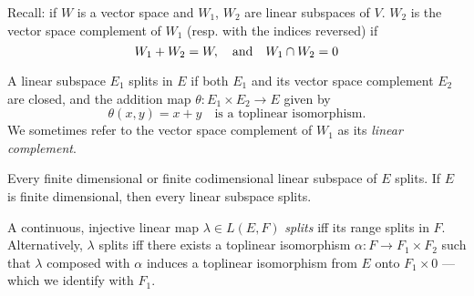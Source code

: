 \documentclass[../main-v2-manifolds.tex]{subfiles}
\begin{document}


Recall: if $W$ is a vector space and $W_1$, $W_2$ are linear subspaces of $V$. $W_2$ is the vector space complement of $W_1$ (resp. with the indices reversed) if 
\[W_1 + W_2 = W,\qqtext{and} W_1\cap W_2 = 0\]
\begin{definition}[Splitting in $E$]\label{def:splitting-subspace}
A linear subspace $E_1$ splits in $E$ if both $E_1$ and its vector space complement $E_2$ are closed, and the addition map $\theta: E_1\times E_2\to E$ given by 
\[
    \theta(x,y)= x + y\quad\text{is a toplinear isomorphism.}
\]
We sometimes refer to the vector space complement of $W_1$ as its \emph{linear complement}.
\end{definition}
\begin{remark}
Every finite dimensional or finite codimensional linear subspace of $E$ splits. If $E$ is finite dimensional, then every linear subspace splits.    
\end{remark}
%
%
%
\begin{definition}[Splitting in $L(E,F)$]\label{def:splitting-clm}
A continuous, injective linear map $\lambda\in L(E,F)$ \emph{splits} iff its range splits in $F$. Alternatively, $\lambda$ splits iff there exists a toplinear isomorphism $\alpha: F\to F_1\times F_2$ such that $\lambda$ composed with $\alpha$ induces a toplinear isomorphism from $E$ onto $F_1\times 0$ --- which we identify with $F_1$. 
\end{definition}
%
%
\end{document}
